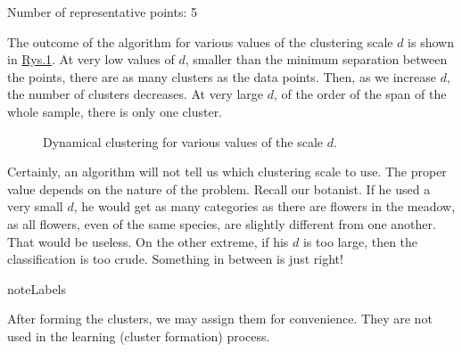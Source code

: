 \documentclass[a4paper,12pt,polish]{jupyterBook}
\let\sphinxpxdimen\pdfpxdimen\else\newdimen\sphinxpxdimen
\begin{document}
\begin{sphinxVerbatimInput}
\begin{sphinxVerbatim}[commandchars=\\\{\}]
\end{sphinxVerbatim}
\end{sphinxVerbatimInput}
\begin{sphinxVerbatimOutput}

\begin{sphinxVerbatim}[commandchars=\\\{\}]
Number of representative points:  5
\end{sphinxVerbatim}
\end{sphinxVerbatimOutput}

\sphinxAtStartPar
The outcome of the algorithm for various values of the clustering scale \(d\) is shown in \hyperref[\detokenize{docs/unsupervised:dyn-fig}]{Rys.\@ \ref{\detokenize{docs/unsupervised:dyn-fig}}}. At very low values of \(d\), smaller than the minimum separation between the points, there are as many clusters as the data points. Then, as we increase \(d\), the number of clusters decreases. At very large \(d\), of the order of the span of the whole sample, there is only one cluster.

\begin{figure}[htbp]
\centering
\capstart

\noindent\sphinxincludegraphics[width=770\sphinxpxdimen]{{cd}.jpg}
\caption{Dynamical clustering for various values of the scale \(d\).}\label{\detokenize{docs/unsupervised:dyn-fig}}\end{figure}

\sphinxAtStartPar
Certainly, an algorithm will not tell us which clustering scale to use. The proper value depends on the nature of the problem. Recall our botanist. If he used a very small \(d\), he would get as many categories as there are flowers in the meadow, as all flowers, even of the same species, are slightly different from one another. That would be useless. On the other extreme, if his \(d\) is too large, then the classification is too crude. Something in between is just right!

\begin{sphinxadmonition}{note}{Labels}

\sphinxAtStartPar
After forming the clusters, we may assign them  for convenience. They are not used in the learning (cluster formation) process.
\end{sphinxadmonition}
\end{document}
